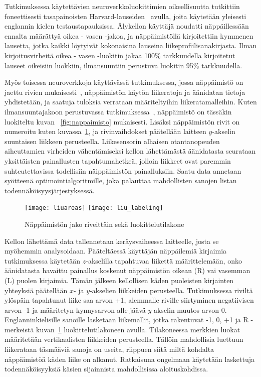 \documentclass[finnish]{tktltiki2}
\theoremstyle{definition}
\theoremstyle{remark}
\begin{document}
Tutkimuksessa käytettävien neuroverkkoluokittimien oikeellisuutta tutkittiin foneettisesti tasapainoisten Harvard-lauseiden~\cite{har} avulla, joita käytetään yleisesti englannin kielen testaustapauksissa. Älykellon käyttäjä noudatti näppäillessään ennalta määrättyä oikea - vasen -jakoa, ja näppäimistöllä kirjoitettiin kymmenen lausetta, jotka kaikki löytyivät kokonaisina lauseina liikeprofiilisanakirjasta. Ilman kirjoitusvirheitä oikea - vasen -luokitin jakaa 100\% tarkkuudella kirjoitetut lauseet oikeisiin luokkiin, ilmansuuntiin perustuva luokitin 95\% tarkkuudella. 

Myös toisessa neuroverkkoja käyttävässä tutkimuksessa, jossa näppäimistö on jaettu rivien mukaisesti~\cite{liu}, näppäimistön käytön liikeratoja ja äänidatan tietoja yhdistetään, ja saatuja tuloksia verrataan määriteltyihin liikeratamalleihin. Kuten ilmansuuntajakoon perustuvassa tutkimuksessa~\cite{maiti}, näppäimistö on tässäkin luokiteltu kuvan ~\ref{fig:nappaimisto} mukaisesti. Lisäksi näppäimistön rivit on numeroitu kuten kuvassa~\ref{fig:liuareas}, ja rivinvaihdokset päätellään laitteen $y$-akselin suuntaisen liikkeen perusteella. Liikesensorin alhaisen otantanopeuden aiheuttamien virheiden vähentämiseksi kellon lähettämästä äänidatasta seurataan yksittäisten painallusten tapahtumahetkeä, jolloin liikkeet ovat paremmin suhteutettavissa todellisiin näippäimistön painalluksiin. Saatu data annetaan syötteenä optimointialgoritmille, joka palauttaa mahdollisten sanojen listan todennäköisyysjärjestyksessä. 

\begin{figure}[!b]
\begin{floatrow}
\texttt{[image: liuareas]}
\texttt{[image: liu\_labeling]}
\end{floatrow}
\caption{Näppäimistön jako riveittäin sekä luokittelutilakone}
\label{fig:liuareas}
\end{figure}

Kellon lähettämä data tallennetaan keräysvaiheessa laitteelle, josta se myöhemmin analysoidaan. Pääteltäessä käyttäjän näppäilemiä kirjaimia tutkimuksessa käytetään $z$-akselilla tapahtuvaa liikettä määrittelemään, onko äänidatasta havaittu painallus koskenut näppäimistön oikean (R) vai vasemman (L) puolen kirjaimia. Tämän jälkeen kellollisen käden puoleisten kirjainten yhteyksiä päätellään $x$- ja $y$-akselien liikkeiden perusteella. Tutkimuksessa riviltä ylöspäin tapahtunut liike saa arvon +1, alemmalle riville siirtyminen negatiivisen arvon -1 ja määritetyn kynnysarvon alle jäävä $y$-akselin muutos arvon 0. Englanninkielisille sanoille lasketaan liikemallit, jotka rakentuvat -1, 0, +1 ja R -merkeistä kuvan~\ref{fig:liuareas} luokittelutilakoneen avulla. Tilakoneessa merkkien luokat määritetään vertikaalisten liikkeiden perusteella. Tällöin mahdollisia luettuun liikerataan täsmääviä sanoja on useita, riippuen siitä miltä kohdalta näppäimistöä käden liike on alkanut. Ratkaisuna ongelmaan käytetään laskettuja todennäköisyyksiä käsien sijainnista mahdollisissa aloituskohdissa.
\end{document}
